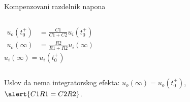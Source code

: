 \begin{frame}[label=08-s067]{Kompenzovani razdelnik napona}
\setlength{\parskip}{2pt}\setlength{\abovedisplayskip}{4pt}\setlength{\belowdisplayskip}{4pt}
\begin{columns}[c,onlytextwidth]
\centering
{}
\begin{align*}
u_o(t_0^+)&=\frac{C1}{C1+C2}u_i(t_0^+)\\
u_o(\infty)&=\frac{R2}{R1+R2}u_i(\infty)
\end{align*}
\centering $u_i(\infty)=u_i(t_0^+)$
\end{columns}\smallskip
Uslov da nema integratorskog efekta:
$u_o(\infty)=u_o(t_0^+)$,\quad $\alert{C1R1=C2R2}$.\par\medskip
\centering
\end{frame}
